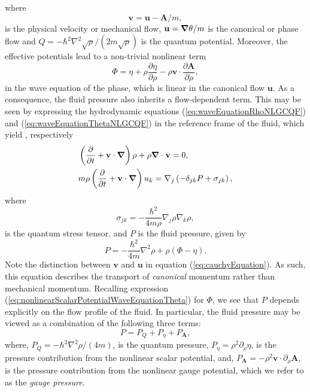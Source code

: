 \documentclass[twocolumn, nofootinbib, nobibnotes, amsmath,amssymb,aps, pra, floatfix]{revtex4-1}
\renewcommand{\v}[1]{\ensuremath{\mathbf{#1}}} %
\newcommand{\gv}[1]{\ensuremath{\mbox{\boldmath$ #1 $}}} %
\newcommand{\pd}[2]{\frac{\partial #1}{\partial #2}} %
\newcommand{\grad}[1]{\gv{\nabla} #1} %
\renewcommand{\div}[1]{\gv{\nabla} \cdot #1} %
\begin{document}
where 
\begin{equation}
    \v{v}=\v{u}-\v{A}/m,
    \label{eq:flow_covariant}
\end{equation}
is the physical velocity or mechanical flow, $\v{u}=\grad{\theta}/m$ is the canonical or phase flow and $Q=-\hbar^2\nabla^2\sqrt{\rho}/\left( 2m\sqrt{\rho} \right)$ is the quantum potential.
Moreover, the effective potentials lead to a non-trivial nonlinear term 
\begin{equation}
	\Phi=\eta+\rho\pd{\eta}{\rho}-\rho\v{v}\cdot\pd{\v{A}}{\rho},
	\label{eq:nonlinearScalarPotentialWaveEquationTheta}
\end{equation}
in the wave equation of the phase, which is linear in the canonical flow $\v{u}$.
As a consequence, the fluid pressure also inherits a flow-dependent term.
This may be seen by expressing the hydrodynamic equations (\ref{eq:waveEquationRhoNLGCQF}) and (\ref{eq:waveEquationThetaNLGCQF}) in the reference frame of the fluid, which yield \cite{buggy2020hydrodynamics}, respectively
\begin{align}
  &\left( \pd{}{t}+\v{v}\cdot\grad{} \right)\rho+\rho\div{\v{v}}=0, \label{eq:waveEquationRhoSecondForm}\\
&m\rho\left( \pd{}{t}+\v{v}\cdot\grad{} \right)u_k=\nabla_j\left( -\delta_{jk}P+\sigma_{jk} \right), \label{eq:cauchyEquation}
\end{align}
where  
\begin{equation}
  \sigma_{jk}=-\frac{\hbar^2}{4m\rho}\nabla_j\rho\nabla_k\rho,
  \label{eq:quantumStressTensor}
\end{equation}
is the quantum stress tensor, and $P$ is the fluid pressure, given by 
\begin{equation}
    P = -\frac{\hbar^2}{4m}\nabla^2\rho+\rho\left(\Phi-\eta\right).
    \label{eq:pressureNLGCQF}
\end{equation}
Note the distinction between $\v{v}$ and $\v{u}$ in equation (\ref{eq:cauchyEquation}).
As such, this equation describes the transport of \textit{canonical} momentum rather than mechanical momentum.
Recalling expression (\ref{eq:nonlinearScalarPotentialWaveEquationTheta}) for $\Phi$, we see that $P$ depends explicitly on the flow profile of the fluid.
In particular, the fluid pressure may be viewed as a combination of the following three terms:
\begin{equation}
    P = P_Q + P_{\eta} + P_{\v{A}}, 
    \label{eq:pressureNLGCQF_combination}
\end{equation}
where, $P_Q=-\hbar^2\nabla^2\rho/(4m)$, is the quantum pressure, $P_{\eta} = \rho^2\partial_{\rho}\eta$, is the pressure contribution from the nonlinear scalar potential, and, $P_{\v{A}} = -\rho^2\v{v}\cdot\partial_{\rho}\v{A}$, is the pressure contribution from the nonlinear gauge potential, which we refer to as the \textit{gauge pressure}.
\end{document}
